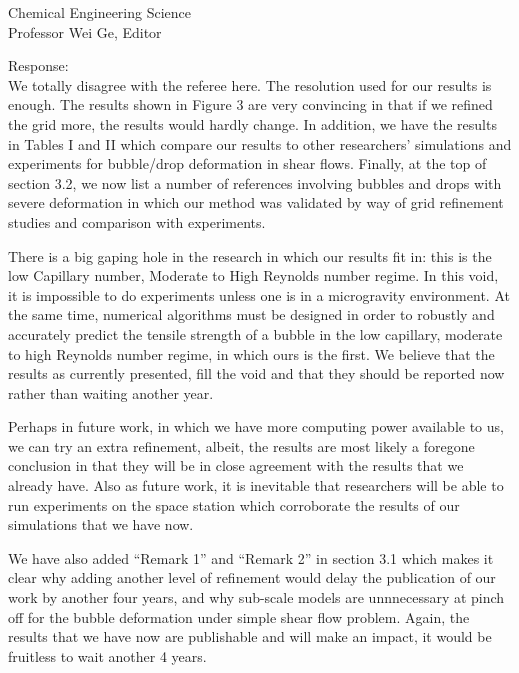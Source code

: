 \documentclass{letter}
\begin{document}
\begin{letter}{
Chemical Engineering Science\\
Professor Wei Ge, Editor\\}
\begin{enumerate}
Response: \\
We totally disagree with the referee here.  The resolution used for our results is enough.  The results shown in Figure 3 are very convincing in that if we refined the grid more, the results would hardly change.  In addition, we have the results in Tables I and II which compare our results to other researchers' simulations and experiments for bubble/drop deformation in shear flows. Finally, at the top of section 3.2, we now list a number of references involving bubbles and drops with severe deformation in which our method was validated by way of grid refinement studies and comparison with experiments.  

There is a big gaping hole in the research in which our results fit in: this is the low Capillary number, Moderate to High Reynolds number regime.  In this void, it is impossible to do experiments unless one is in a microgravity environment.  At the same time, numerical algorithms must be designed in order to robustly and accurately predict the tensile strength of a bubble in the low capillary, moderate to high Reynolds number regime, in which ours is the first.  We believe that the results as currently presented, fill the void and that they should be reported now rather than waiting another year.

Perhaps in future work, in which we have more computing power available to us, we can try an extra refinement, albeit, the results are most likely a foregone conclusion in that they will be in close agreement with the results that we already have.  Also as future work, it is inevitable that researchers will be able to run experiments on the space station which corroborate the results of our simulations that we have now.

We have also added ``Remark 1'' and ``Remark 2'' in section 3.1 which makes it clear why adding another level of refinement would delay the publication of our work by another four years, and why sub-scale models are unnnecessary at pinch off for the bubble deformation under simple shear flow problem.  Again, the results that we have now are publishable and will make an impact, it would be fruitless to wait another 4 years.


\end{enumerate}
\end{letter}
\end{document}
